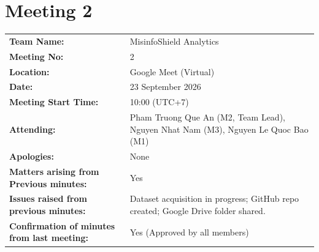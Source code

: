 \documentclass[11pt, a4paper]{article}
\begin{document}
\newpage

\section*{Meeting 2}
\label{sec:meeting2}

\begin{table}[H]
  \centering
  \small
  \begin{tabularx}{\linewidth}{@{}L{3.5cm} Y@{}}
    \toprule
    \textbf{Team Name:} & MisinfoShield Analytics \\
    \textbf{Meeting No:} & 2 \\
    \textbf{Location:} & Google Meet (Virtual) \\
    \textbf{Date:} & 23 September 2026 \\
    \textbf{Meeting Start Time:} & 10:00 (UTC+7) \\
    \textbf{Attending:} & Pham Truong Que An (M2, Team Lead), Nguyen Nhat Nam (M3), Nguyen Le Quoc Bao (M1) \\
    \textbf{Apologies:} & None \\
    \textbf{Matters arising from Previous minutes:} & Yes \\
    \textbf{Issues raised from previous minutes:} & Dataset acquisition in progress; GitHub repo created; Google Drive folder shared. \\
    \textbf{Confirmation of minutes from last meeting:} & Yes (Approved by all members) \\
    \bottomrule
  \end{tabularx}
\end{table}
\end{document}

